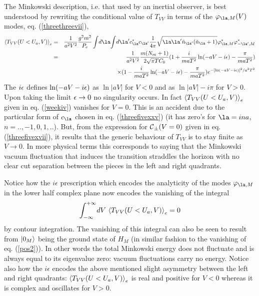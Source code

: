 \documentclass[12pt]{article}
\begin{document}
The Minkowski description, i.e. that used by an inertial observer, is best
understood by rewriting the conditional value of $T_{VV}$ in terms of the
$\varphi_{\la,M}(V)$ modes, eq. (\ref{threethreevii}),
\begin{eqnarray}
 \bk{T_{VV}(U<U_a,V)}_{e}
&=& {1 \over a^2 V^2}{ g^2 m^2 \over P_{e}} \int\! d\la \!\int
\!d\la^\prime c_\la^* c_{\la^\prime}
{1 \over 4 \pi} \sqrt{  \la \la^\prime
\tilde n_{\la^\prime} ( \tilde n_\la +1)
}
 \varphi^*_{\la,M}
\varphi^*_{-\la^\prime,M}
\nonumber\\ &=&
{1 \over a^2 V^2} {m (N_m + 1)\over  2
\sqrt{\pi} T C_0}( 1 + {i \over m a T^2} \ln (-aV-i\e) -{ \pi \over m a T^2})
\nonumber\\  &\ &
 \times  ( 1 - {i \over m a T^2} \ln (-aV-i\e) -{ \pi
\over m a T^2}) e^{-\left[ \ln (-aV-i\epsilon) \right]^2 / a^2 T^2}
\label{weekiv}
\end{eqnarray}
The $i \mbox{$ \epsilon $}$  defines
$\ln (-aV-i\mbox{$ \epsilon $})$ as $\ln \vert aV \vert $ for $V<0$ and as
$\ln \vert aV \vert
- i \pi$ for $V>0$. Upon taking the limit $\mbox{$ \epsilon $}
\rightarrow 0$ no singularity occurs.
In fact
$\mbox{$ \langle T_{VV}(U<U_a,V) \rangle $}_{e}$ given in eq. (\ref{weekiv}) vanishes for $V=0$.
This is an accident due to the particular form of $c_\la$ chosen in
eq. (\ref{threefivexxv}) (it has
zero's for $\la=i n a$, $n= ..,-1,0,1,..$).
But, from the expression for $\cc_{\pm} (V=0)$ given
in eq. (\ref{threefivexvii}), it
results that the generic behaviour of $T_{VV}$ is to stay finite as $V
\to 0$. In more physical terms this corresponds to saying
that
the Minkowski vacuum fluctuation that induces the transition straddles
the
horizon with no clear cut separation between the pieces in the left and
right
quadrants.


Notice how the $i\epsilon$ prescription which encodes the analyticity of the
modes $\varphi_{\la,M}$ in the lower half complex plane now encodes the
vanishing of the integral
\begin{equation}
\int_{-\infty}^{+\infty}\!dV\
 \mbox{$ \langle T_{VV}(U<U_a,V) \rangle $}_{e} =0
\label{vanenf}\end{equation}
by contour integration. The vanishing of this
integral can also be seen to result from $\mbox{$ \vert 0_M \rangle $}$ being the ground state
of $H_M$ (in similar fashion to the vanishing of eq. (\ref{pos2})).
In other words the total
Minkowski energy does
not fluctuate and is always equal to its eigenvalue zero: vacuum
fluctuations carry no energy.
Notice also how the $i\epsilon$ encodes the above mentioned
slight asymmetry between the left
 and right quadrants: $\mbox{$ \langle T_{VV}(U<U_a,V) \rangle $}_{e}$ is real and
positive for $V<0$ whereas it is complex and oscillates for $V>0$.
\end{document}
